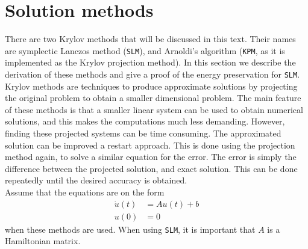 \section{Solution methods} \label{sec:solmet} %
\label{sec:KPM}
\noindent There are two Krylov methods that will be discussed in this text. Their names are symplectic Lanczos method (\texttt{SLM}), and Arnoldi's algorithm (\texttt{KPM}, as it is implemented as the Krylov projection method). In this section we describe the derivation of these methods and give a proof of the energy preservation for \texttt{SLM}. \\

\noindent Krylov methods are techniques to produce approximate solutions by projecting the original problem to obtain a smaller dimensional problem. The main feature of these methods is that a smaller linear system can be used to obtain numerical solutions, and this makes the computations much less demanding. However, finding these projected systems can be time consuming. The approximated solution can be improved a restart approach. This is done using the projection method again, to solve a similar equation for the error. The error is simply the difference between the projected solution, and exact solution. This can be done repeatedly until the desired accuracy is obtained. \\


\noindent Assume that the equations are on the form
\begin{equation}
\begin{aligned}
\dot{u}(t) &= Au(t) + b \\
u(0) &= 0
\end{aligned}
\label{eqn:PMform}
\end{equation}
\noindent when these methods are used.  %
When using \texttt{SLM}, it is important that $A$ is a Hamiltonian matrix. \\


